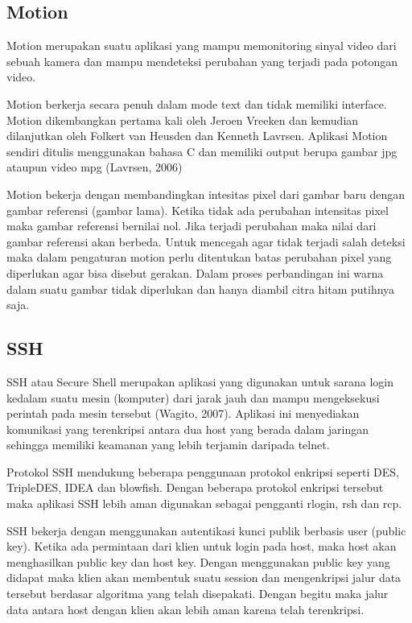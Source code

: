 \documentclass{jtetiproposalskripsi}
\begin{document}
\subsection{Motion}
Motion merupakan suatu aplikasi yang mampu memonitoring sinyal video dari sebuah kamera dan mampu mendeteksi perubahan yang terjadi pada potongan video.

Motion berkerja secara penuh dalam mode text dan tidak memiliki interface. Motion dikembangkan pertama kali oleh Jeroen Vreeken dan kemudian dilanjutkan oleh Folkert van Heusden dan Kenneth Lavrsen. Aplikasi Motion sendiri ditulis menggunakan bahasa C dan memiliki output berupa gambar jpg ataupun video mpg (Lavrsen, 2006)

Motion bekerja dengan membandingkan intesitas pixel dari gambar baru dengan gambar referensi (gambar lama). Ketika tidak ada perubahan intensitas pixel maka gambar referensi bernilai nol. Jika terjadi perubahan maka nilai dari gambar referensi akan berbeda. Untuk mencegah agar tidak terjadi salah deteksi maka dalam pengaturan motion perlu ditentukan batas perubahan pixel yang diperlukan agar bisa disebut gerakan. Dalam proses perbandingan ini warna dalam suatu gambar tidak diperlukan dan hanya diambil citra hitam putihnya saja.


\subsection{SSH}
SSH atau Secure Shell merupakan aplikasi yang digunakan untuk sarana login kedalam suatu mesin (komputer) dari jarak jauh dan mampu mengeksekusi perintah pada mesin tersebut (Wagito, 2007). Aplikasi ini menyediakan komunikasi yang terenkripsi antara dua host yang berada dalam jaringan sehingga memiliki keamanan yang lebih terjamin daripada telnet.

Protokol SSH mendukung beberapa penggunaan protokol enkripsi seperti DES, TripleDES, IDEA dan blowfish. Dengan beberapa protokol enkripsi tersebut maka aplikasi SSH lebih aman digunakan sebagai pengganti rlogin, rsh dan rcp.

SSH bekerja dengan menggunakan autentikasi kunci publik berbasis user (public key). Ketika ada permintaan dari klien untuk login pada host, maka host akan menghasilkan public key dan host key. Dengan menggunakan public key yang didapat maka klien akan membentuk suatu session dan mengenkripsi jalur data tersebut berdasar algoritma yang telah disepakati. Dengan begitu maka jalur data antara host dengan klien akan lebih aman karena telah terenkripsi.
\end{document}
